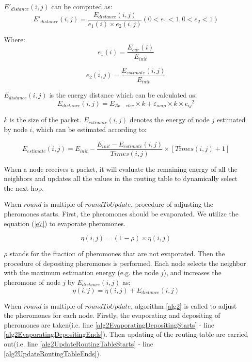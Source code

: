 \documentclass{elsarticle}
\begin{document}
$E'_{distance}(i,j)$ can be computed as:
\begin{equation}
E'_{distance}(i,j)= \frac{E_{distance}(i,j)}{e_{1}(i) \times e_{2}(i,j)} (0<e_1<1, 0<e_2<1)
\end{equation}

Where:
\begin{equation}
e_1(i)=\frac{E_{cur}(i)}{E_{init}}
\end{equation}

\begin{equation}
e_2(i,j)=\frac{E_{estimate}(i,j)}{E_{init}}
\end{equation}

$E_{distance}(i,j)$ is the energy distance which can be calculated as:
\begin{equation}
E_{distance}(i,j)=E_{Tx-elec} \times k + \varepsilon_{amp} \times k \times {e_{ij}}^2
\end{equation}

$k$ is the size of the packet. $E_{estimate}(i,j)$  denotes the energy of node $j$ estimated by node $i$, which can be estimated according to:

\begin{equation}
E_{estimate}(i,j)= E_{init} - \frac{E_{init} - E_{estimate}(i,j)}{Times(i,j)} \times [Times(i,j) + 1]
\end{equation}

When a node receives a packet, it will evaluate the remaining energy of all the neighbors and updates all the values in the routing table to dynamically select the next hop.

When $round$ is multiple of $roundToUpdate$, procedure of adjusting the pheromones starts. First, the pheromones should be evaporated. We utilize the equation (\ref{e7}) to evaporate pheromones.

\begin{equation} \label{e7}
\eta(i,j)= (1- \rho) \times \eta(i,j)
\end{equation}

$\rho$ stands for the fraction of pheromones that are not evaporated. Then the procedure of depositing pheromones is performed. Each node selects the neighbor with the maximum estimation energy (e.g. the node $j$), and increases the pheromone of node $j$ by $E_{distance}(i,j)$ as:
\begin{equation} \label{e8}
\eta(i,j)= \eta(i,j) + E_{distance}(i,j)
\end{equation}

When $round$ is multiple of $roundToUpdate$, algorithm \ref{alg2} is called to adjust the pheromones for each node. Firstly, the evaporating and depositing of pheromones are taken(i.e. line \ref{alg2EvaporatingDepositingStarts} - line \ref{alg2EvaporatingDepositingEnds}). Then updating of the routing table are carried out(i.e. line \ref{alg2UpdateRoutingTableStarts} - line \ref{alg2UpdateRoutingTableEnds}).
\end{document}
